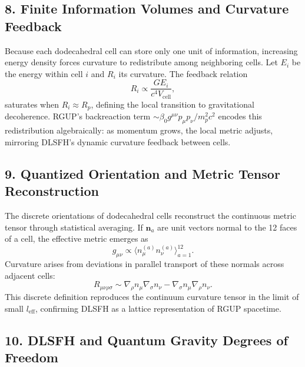 \documentclass[11pt,oneside]{book}
\numberwithin{equation}{chapter}
\newcommand{\betaz}{\beta_0}
\begin{document}
\subsection*{8. Finite Information Volumes and Curvature Feedback}

Because each dodecahedral cell can store only one unit of information, increasing energy density forces curvature to redistribute among neighboring cells.  
Let $E_i$ be the energy within cell $i$ and $R_i$ its curvature.  
The feedback relation
\begin{equation}
R_i \propto \frac{G E_i}{c^4 V_{\text{cell}}},
\end{equation}
saturates when $R_i \approx R_p$, defining the local transition to gravitational decoherence.  
RGUP’s backreaction term $\sim \betaz g^{\mu\nu}p_\mu p_\nu/m_p^2 c^2$ encodes this redistribution algebraically: as momentum grows, the local metric adjusts, mirroring DLSFH’s dynamic curvature feedback between cells.

\subsection*{9. Quantized Orientation and Metric Tensor Reconstruction}

The discrete orientations of dodecahedral cells reconstruct the continuous metric tensor through statistical averaging.  
If $\mathbf{n}_a$ are unit vectors normal to the 12 faces of a cell, the effective metric emerges as
\begin{equation}
g_{\mu\nu} \propto 
\langle n_\mu^{(a)} n_\nu^{(a)} \rangle_{a=1}^{12}.
\end{equation}
Curvature arises from deviations in parallel transport of these normals across adjacent cells:
\begin{equation}
R_{\mu\nu\rho\sigma}
\sim \nabla_\rho n_\mu \nabla_\sigma n_\nu
- \nabla_\sigma n_\mu \nabla_\rho n_\nu.
\end{equation}
This discrete definition reproduces the continuum curvature tensor in the limit of small $l_{\text{eff}}$, confirming DLSFH as a lattice representation of RGUP spacetime.

\subsection*{10. DLSFH and Quantum Gravity Degrees of Freedom}
\end{document}
